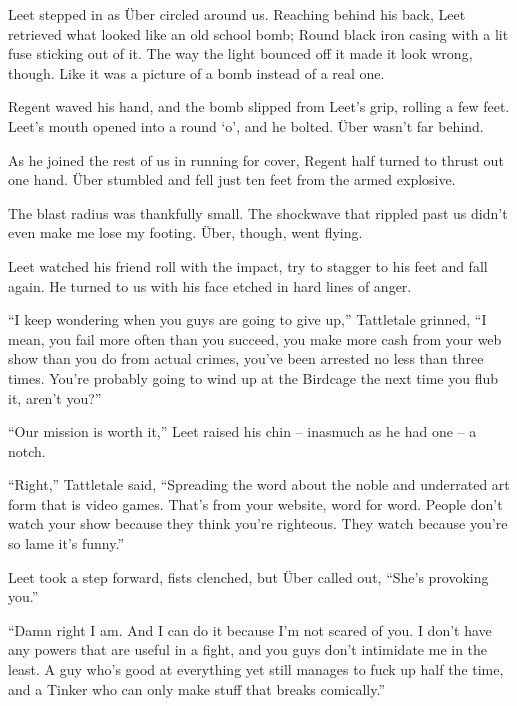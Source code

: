 Leet stepped in as \"{U}ber circled around us.  Reaching behind his back, Leet retrieved what looked like an old school bomb; Round black iron casing with a lit fuse sticking out of it.  The way the light bounced off it made it look wrong, though.  Like it was a picture of a bomb instead of a real one.



Regent waved his hand, and the bomb slipped from Leet's grip, rolling a few feet.  Leet's mouth opened into a round `o', and he bolted.  \"{U}ber wasn't far behind.



As he joined the rest of us in running for cover, Regent half turned to thrust out one hand.  \"{U}ber stumbled and fell just ten feet from the armed explosive.



The blast radius was thankfully small.  The shockwave that rippled past us didn't even make me lose my footing.  \"{U}ber, though, went flying.



Leet watched his friend roll with the impact, try to stagger to his feet and fall again.  He turned to us with his face etched in hard lines of anger.



``I keep wondering when you guys are going to give up,'' Tattletale grinned, ``I mean, you fail more often than you succeed, you make more cash from your web show than you do from actual crimes, you've been arrested no less than three times.  You're probably going to wind up at the Birdcage the next time you flub it, aren't you?''



``Our mission is worth it,'' Leet raised his chin – inasmuch as he had one – a notch.



``Right,'' Tattletale said, ``Spreading the word about the noble and underrated art form that is video games.  That's from your website, word for word.  People don't watch your show because they think you're righteous.  They watch because you're so lame it's funny.''



Leet took a step forward, fists clenched, but \"{U}ber called out, ``She's provoking you.''



``Damn right I am.  And I can do it because I'm not scared of you.  I don't have any powers that are useful in a fight, and you guys don't intimidate me in the least.  A guy who's good at everything yet still manages to fuck up half the time, and a Tinker who can only make stuff that breaks comically.''



